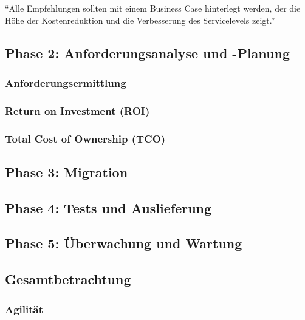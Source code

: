 "`Alle Empfehlungen sollten mit einem Business Case hinterlegt werden, der 
die Höhe der Kostenreduktion und die Verbesserung des Servicelevels zeigt."' 
 
\subsection{Phase 2: Anforderungsanalyse und -Planung}
\subsubsection{Anforderungsermittlung}
\subsubsection{Return on Investment (ROI)}
\subsubsection{Total Cost of Ownership (TCO)}

\subsection{Phase 3: Migration}
\subsection{Phase 4: Tests und Auslieferung}
\subsection{Phase 5: Überwachung und Wartung}
\subsection{Gesamtbetrachtung}
\subsubsection{Agilität}



